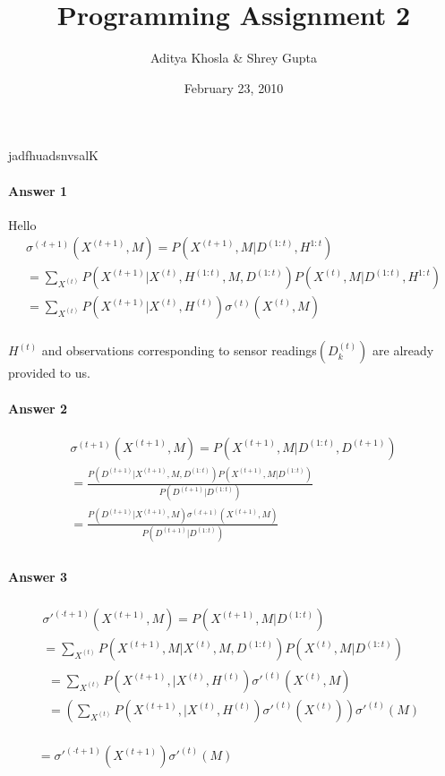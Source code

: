 \documentclass[12pt]{article}
\title{Programming Assignment 2}
\author{Aditya Khosla \& Shrey Gupta}
\date{February 23, 2010}
\begin{document}
\maketitle
jadfhuadsnvsalK
\paragraph{Answer 1} 
Hello
\[
\begin{array}{l}
 {\sigma ^{( \cdot t + 1)}}({X^{(t + 1)}},M) = P({X^{(t + 1)}},M|{D^{(1:t)}}, {H^{1:t}}) \\ 
  = \sum\limits_{{X^{(t)}}} {P({X^{(t + 1)}}|{X^{(t)}},{H^{(1:t)}},M,{D^{(1:t)}})} P({X^{(t)}},M|{D^{(1:t)}}, {H^{1:t}}) \\ 
  = \sum\limits_{{X^{(t)}}} {P({X^{(t + 1)}}|{X^{(t)}},{H^{(t)}}){\sigma ^{(t)}}({X^{(t)}},M)}  \\ 
 \end{array}
 
 \]
 
 ${H^{(t)}}$ and observations corresponding to sensor readings$(D_k^{(t)})$ are already provided to us. \\
\paragraph{Answer 2} 

\[\begin{array}{l}
 {\sigma ^{(t + 1)}}({X^{(t + 1)}},M) = P({X^{(t + 1)}},M|{D^{(1:t)}},{D^{(t + 1)}}) \\ 
  = \frac{{P({D^{(t + 1)}}|{X^{(t + 1)}},M,{D^{(1:t)}})P({X^{(t + 1)}},M|{D^{(1:t)}})}}{{P({D^{(t + 1)}}|{D^{(1:t)}})}} \\ 
  = \frac{{P({D^{(t + 1)}}|{X^{(t + 1)}},M){\sigma ^{( \cdot t + 1)}}({X^{(t + 1)}},M)}}{{P({D^{(t + 1)}}|{D^{(1:t)}})}} \\ 
 \end{array}\]

\paragraph{Answer 3}

\[\begin{array}{l}
 \begin{array}{*{20}{c}}
   {\sigma {'^{(\cdot t + 1)}}({X^{(t + 1)}},M) = P({X^{(t + 1)}},M|{D^{(1:t)}})}  \\
   { = \sum\limits_{{X^{(t)}}} {P({X^{(t + 1)}},M|{X^{(t)}},M,{D^{(1:t)}})} P({X^{(t)}},M|{D^{(1:t)}})}  \\
   \begin{array}{l}
  = \sum\limits_{{X^{(t)}}} {P({X^{(t + 1)}},|{X^{(t)}},{H^{(t)}})\sigma {'^{(t)}}({X^{(t)}},M)}  \\ 
  = \left( {\sum\limits_{{X^{(t)}}} {P({X^{(t + 1)}},|{X^{(t)}},{H^{(t)}})\sigma {'^{(t)}}({X^{(t)}})} } \right)\sigma {'^{(t)}}(M) \\ 
 \end{array}  \\
\end{array} \\ 
  = \sigma {'^{(\cdot t + 1)}}({X^{(t + 1)}})\sigma {'^{(t)}}(M) \\ 
 \end{array}\]
 
\end{document}
